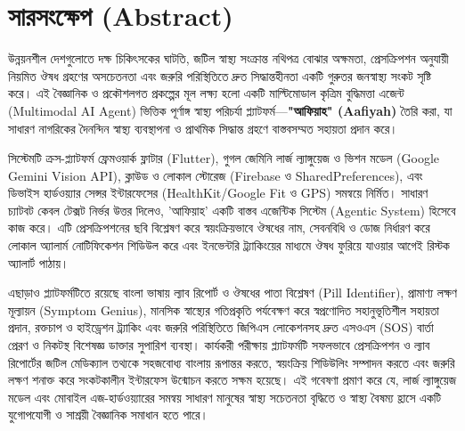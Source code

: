 \documentclass[12pt,a4paper,oneside]{report}
\begin{document}
\chapter{সারসংক্ষেপ (Abstract)}

\begin{highlightbox}[title=বৈজ্ঞানিক সারসংক্ষেপ (Scientific Abstract)]
উন্নয়নশীল দেশগুলোতে দক্ষ চিকিৎসকের ঘাটতি, জটিল স্বাস্থ্য সংক্রান্ত নথিপত্র বোঝার অক্ষমতা, প্রেসক্রিপশন অনুযায়ী নিয়মিত ঔষধ গ্রহণের অসচেতনতা এবং জরুরি পরিস্থিতিতে দ্রুত সিদ্ধান্তহীনতা একটি গুরুতর জনস্বাস্থ্য সংকট সৃষ্টি করে। এই বৈজ্ঞানিক ও প্রকৌশলগত প্রকল্পের মূল লক্ষ্য হলো একটি মাল্টিমোডাল কৃত্রিম বুদ্ধিমত্তা এজেন্ট (Multimodal AI Agent) ভিত্তিক পূর্ণাঙ্গ স্বাস্থ্য পরিচর্যা প্ল্যাটফর্ম—\textbf{"আফিয়াহ" (Aafiyah)} তৈরি করা, যা সাধারণ নাগরিকের দৈনন্দিন স্বাস্থ্য ব্যবস্থাপনা ও প্রাথমিক সিদ্ধান্ত গ্রহণে বাস্তবসম্মত সহায়তা প্রদান করে।

সিস্টেমটি ক্রস-প্ল্যাটফর্ম ফ্রেমওয়ার্ক ফ্লাটার (Flutter), গুগল জেমিনি লার্জ ল্যাঙ্গুয়েজ ও ভিশন মডেল (Google Gemini Vision API), ক্লাউড ও লোকাল স্টোরেজ (Firebase ও SharedPreferences), এবং ডিভাইস হার্ডওয়্যার সেন্সর ইন্টারফেসের (HealthKit/Google Fit ও GPS) সমন্বয়ে নির্মিত। সাধারণ চ্যাটবট কেবল টেক্সট নির্ভর উত্তর দিলেও, 'আফিয়াহ' একটি বাস্তব এজেন্টিক সিস্টেম (Agentic System) হিসেবে কাজ করে। এটি প্রেসক্রিপশনের ছবি বিশ্লেষণ করে স্বয়ংক্রিয়ভাবে ঔষধের নাম, সেবনবিধি ও ডোজ নির্ধারণ করে লোকাল অ্যালার্ম নোটিফিকেশন শিডিউল করে এবং ইনভেন্টরি ট্র্যাকিংয়ের মাধ্যমে ঔষধ ফুরিয়ে যাওয়ার আগেই রিস্টক অ্যালার্ট পাঠায়।

এছাড়াও প্ল্যাটফর্মটিতে রয়েছে বাংলা ভাষায় ল্যাব রিপোর্ট ও ঔষধের পাতা বিশ্লেষণ (Pill Identifier), প্রামাণ্য লক্ষণ মূল্যায়ন (Symptom Genius), মানসিক স্বাস্থ্যের গতিপ্রকৃতি পর্যবেক্ষণ করে স্বপ্রণোদিত সহানুভূতিশীল সহায়তা প্রদান, রক্তচাপ ও হাইড্রেশন ট্র্যাকিং এবং জরুরি পরিস্থিতিতে জিপিএস লোকেশনসহ দ্রুত এসওএস (SOS) বার্তা প্রেরণ ও নিকটস্থ বিশেষজ্ঞ ডাক্তার সুপারিশ ব্যবস্থা। কার্যকরী পরীক্ষায় প্ল্যাটফর্মটি সফলভাবে প্রেসক্রিপশন ও ল্যাব রিপোর্টের জটিল মেডিক্যাল তথ্যকে সহজবোধ্য বাংলায় রূপান্তর করতে, স্বয়ংক্রিয় শিডিউলিং সম্পাদন করতে এবং জরুরি লক্ষণ শনাক্ত করে সংকটকালীন ইন্টারফেস উন্মোচন করতে সক্ষম হয়েছে। এই গবেষণা প্রমাণ করে যে, লার্জ ল্যাঙ্গুয়েজ মডেল এবং মোবাইল এজ-হার্ডওয়্যারের সমন্বয় সাধারণ মানুষের স্বাস্থ্য সচেতনতা বৃদ্ধিতে ও স্বাস্থ্য বৈষম্য হ্রাসে একটি যুগোপযোগী ও সাশ্রয়ী বৈজ্ঞানিক সমাধান হতে পারে।
\end{highlightbox}

\end{document}
